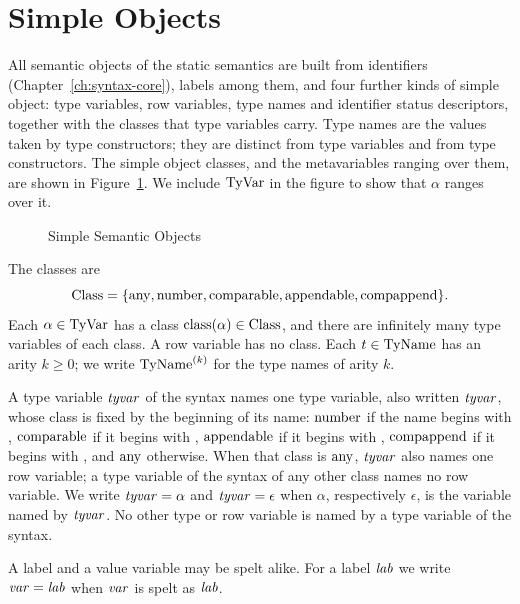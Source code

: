 \section{Simple Objects}\label{sec:static-core-simple}

All semantic objects of the static semantics are built from identifiers
(Chapter~\ref{ch:syntax-core}), labels among them, and four further kinds of
simple object: type variables, row variables, type names and identifier status
descriptors, together with the classes that type variables carry. Type names
are the values taken by type constructors; they are distinct from type
variables and from type constructors. The simple object classes, and the
metavariables ranging over them, are shown in Figure~\ref{fig:static-core-simple}.
We include $\mathrm{TyVar}$ in the figure to show that $\alpha$ ranges over it.

\begin{figure}[ht]
\centering
\begin{objtable}
\end{objtable}
\caption{Simple Semantic Objects}\label{fig:static-core-simple}
\end{figure}

The classes are
\[
  \mathrm{Class} = \{\mathrm{any}, \mathrm{number}, \mathrm{comparable}, \mathrm{appendable}, \mathrm{compappend}\}.
\]
Each $\alpha \in \mathrm{TyVar}$ has a class $\mathrm{class}(\alpha) \in \mathrm{Class}$, and there
are infinitely many type variables of each class. A row variable has no class.
Each $t \in \mathrm{TyName}$ has an arity $k \ge 0$; we write $\mathrm{TyName}^{(k)}$ for the
type names of arity $k$.

A type variable $\mathit{tyvar}$ of the syntax names one type variable, also written
$\mathit{tyvar}$, whose class is fixed by the beginning of its name: $\mathrm{number}$ if the
name begins with , $\mathrm{comparable}$ if it begins with ,
$\mathrm{appendable}$ if it begins with , $\mathrm{compappend}$ if it begins with
, and $\mathrm{any}$ otherwise. %
When that class is $\mathrm{any}$, $\mathit{tyvar}$ also names one row variable; a type
variable of the syntax of any other class names no row variable. %
We write $\mathit{tyvar} = \alpha$ and $\mathit{tyvar} = \epsilon$ when $\alpha$, respectively
$\epsilon$, is the variable named by $\mathit{tyvar}$. No other type or row variable is
named by a type variable of the syntax.

A label and a value variable may be spelt alike. For a label $\mathit{lab}$ we write
$\mathit{var} = \mathit{lab}$ when $\mathit{var}$ is spelt as $\mathit{lab}$.

